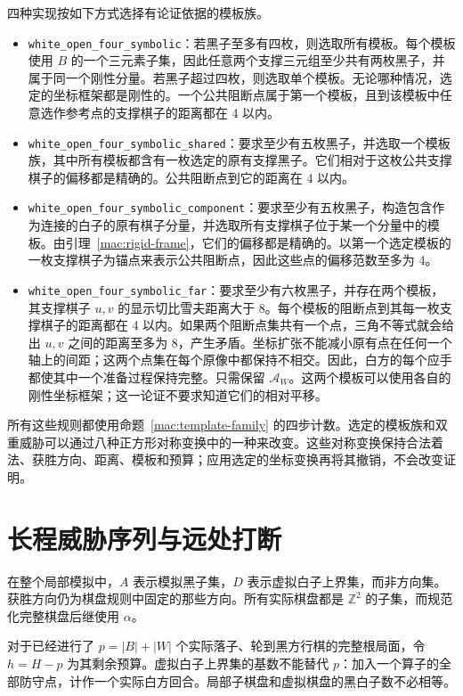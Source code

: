 \documentclass[11pt]{article}
\theoremstyle{definition}
\theoremstyle{remark}
\newcommand{\Z}{\mathbb Z}
\newcommand{\A}{\alpha}
\begin{document}
四种实现按如下方式选择有论证依据的模板族。

\begin{itemize}
\item \texttt{white\_open\_four\_symbolic}：若黑子至多有四枚，则选取所有模板。每个模板使用 \(B\) 的一个三元素子集，因此任意两个支撑三元组至少共有两枚黑子，并属于同一个刚性分量。若黑子超过四枚，则选取单个模板。无论哪种情况，选定的坐标框架都是刚性的。一个公共阻断点属于第一个模板，且到该模板中任意选作参考点的支撑棋子的距离都在 4 以内。
\item \texttt{white\_open\_four\_symbolic\_shared}：要求至少有五枚黑子，并选取一个模板族，其中所有模板都含有一枚选定的原有支撑黑子。它们相对于这枚公共支撑棋子的偏移都是精确的。公共阻断点到它的距离在 4 以内。
\item \texttt{white\_open\_four\_symbolic\_component}：要求至少有五枚黑子，构造包含作为连接的白子的原有棋子分量，并选取所有支撑棋子位于某一个分量中的模板。由引理~\ref{mac:rigid-frame}，它们的偏移都是精确的。以第一个选定模板的一枚支撑棋子为锚点来表示公共阻断点，因此这些点的偏移范数至多为 4。
\item \texttt{white\_open\_four\_symbolic\_far}：要求至少有六枚黑子，并存在两个模板，其支撑棋子 \(u,v\) 的显示切比雪夫距离大于 8。每个模板的阻断点到其每一枚支撑棋子的距离都在 4 以内。如果两个阻断点集共有一个点，三角不等式就会给出 \(u,v\) 之间的距离至多为 8，产生矛盾。坐标扩张不能减小原有点在任何一个轴上的间距；这两个点集在每个原像中都保持不相交。因此，白方的每个应手都使其中一个准备过程保持完整。只需保留 \(\mathcal A_W\)。这两个模板可以使用各自的刚性坐标框架；这一论证不要求知道它们的相对平移。

\end{itemize}
所有这些规则都使用命题~\ref{mac:template-family} 的四步计数。选定的模板族和双重威胁可以通过八种正方形对称变换中的一种来改变。这些对称变换保持合法着法、获胜方向、距离、模板和预算；应用选定的坐标变换再将其撤销，不会改变证明。

\section{长程威胁序列与远处打断}\label{sec:long}
在整个局部模拟中，$A$ 表示模拟黑子集，$D$ 表示虚拟白子上界集，而非方向集。获胜方向仍为棋盘规则中固定的那些方向。所有实际棋盘都是 $\Z^2$ 的子集，而规范化完整棋盘后继使用 $\A$。

对于已经进行了 $p=|B|+|W|$ 个实际落子、轮到黑方行棋的完整根局面，令 $h=H-p$ 为其剩余预算。虚拟白子上界集的基数不能替代 $p$：加入一个算子的全部防守点，计作一个实际白方回合。局部子棋盘和虚拟棋盘的黑白子数不必相等。
\end{document}
